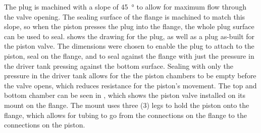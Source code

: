 





The plug is machined with a slope of \SI{45}{\degree} to allow for maximum flow through the valve opening. The sealing surface of the flange is machined to match this slope, so when the piston presses the plug into the flange, the whole plug surface can be used to seal.  shows the drawing for the plug, as well as a plug as-built for the piston valve. The dimensions were chosen to enable the plug to attach to the piston, seal on the flange, and to seal against the flange with just the pressure in the driver tank pressing against the bottom surface. Sealing with only the pressure in the driver tank allows for the the piston chambers to be empty before the valve opens, which reduces resistance for the piston's movement. The top and bottom chamber can be seen in , which shows the piston valve installed on its mount on the flange. The mount uses three (3) legs to hold the piston onto the flange, which allows for tubing to go from the connections on the flange to the connections on the piston.


